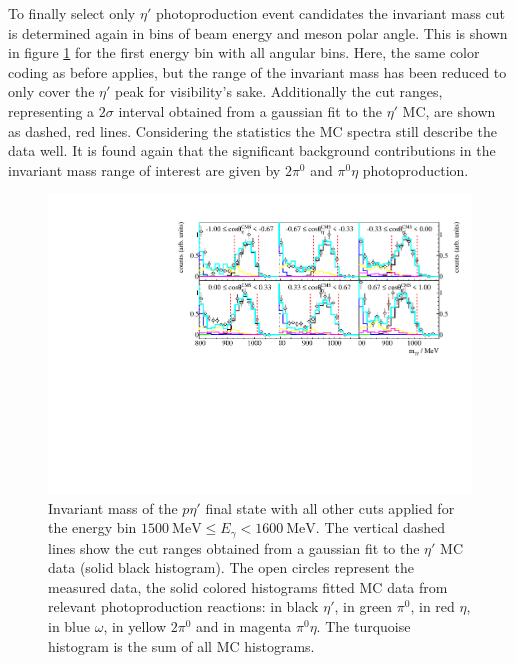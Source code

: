 To finally select only $\eta'$ photoproduction event candidates the invariant mass cut is determined again in bins of beam energy and meson polar angle. This is shown in figure \ref{fig:invm} for the first energy bin with all angular bins. Here, the same color coding as before applies, but the range of the invariant mass has been reduced to only cover the $\eta'$ peak for visibility's sake. Additionally the cut ranges, representing a $2\sigma$ interval obtained from a gaussian fit to the $\eta'$ MC, are shown as dashed, red lines. Considering the statistics the MC spectra still describe the data well. It is found again that the significant background contributions in the invariant mass range of interest are given by $2\pi^0$ and $\pi^0\eta$ photoproduction.  
\begin{figure}[htbp]
 	\centering
 	\includegraphics[width=\linewidth]{../figs/hydrogen/bin_cuts/invcut_ebin1.pdf}
 	\caption{Invariant mass of the $p\eta'$ final state with all other cuts applied for the energy bin $\SI{1500}{\mega\eV}\leq E_\gamma<\SI{1600}{\mega\eV}$. The vertical dashed lines show the cut ranges obtained from a gaussian fit to the $\eta'$ MC data (solid black histogram). The open circles represent the measured data, the solid colored histograms fitted MC data from relevant photoproduction reactions: in black $\eta'$, in green $\pi^0$, in red $\eta$, in blue $\omega$, in yellow $2\pi^0$ and in magenta $\pi^0\eta$. The turquoise histogram is the sum of all MC histograms.}
 	\label{fig:invm}
\end{figure}
